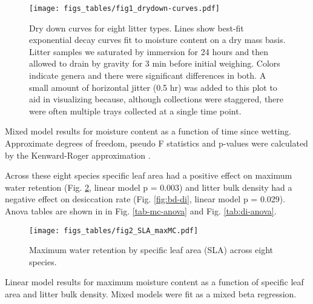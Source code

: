 \documentclass[fire,article,submit,moreauthors,pdftex]{Definitions/mdpi}
\begin{document}
\begin{figure}[H]
  \centering
\texttt{[image: figs\_tables/fig1\_drydown-curves.pdf]}
\caption{Dry down curves for eight litter types. Lines show best-fit
  exponential decay curves fit to moisture content on a dry mass basis. Litter
  samples we saturated by immersion for 24 hours and then allowed to drain by
  gravity for 3 min before initial weighing. Colors indicate genera and there
  were significant differences in both. A small amount of horizontal jitter
  (0.5 hr) was added to this plot to aid in visualizing because, although
  collections were staggered, there were often multiple trays collected at a
  single time point.}
 \label{fig:drydown}
\end{figure}


\begin{table}[H]
  \caption{Mixed model results for moisture content as a function of time since
    wetting. Approximate degrees of freedom, pseudo F statistics and p-values
    were calculated by the Kenward-Roger approximation
    \cite{Kenward_Roger-1997}.}
  \label{tab:drydown}
\centering

\end{table}


Across these eight species specific leaf area had a positive effect on maximum
water retention (Fig. \ref{fig:maxmc-di}, linear model p = 0.003) and litter
bulk density had a negative effect on desiccation rate (Fig. \ref{fig:bd-di},
linear model p = 0.029). Anova tables are shown in in Fig. \ref{tab-mc-anova}
and Fig. \ref{tab:di-anova}.

\begin{figure}[H]
  \centering
\texttt{[image: figs\_tables/fig2\_SLA\_maxMC.pdf]}
\caption{Maximum water retention by specific leaf area (SLA) across eight species.}
  \label{fig:maxmc-di}
\end{figure}

\begin{table}[H]
  \caption{Linear model results for maximum moisture content as a function of specific leaf area and litter bulk density. Mixed models were fit as a mixed beta regression. }
  \label{tab2:mc-anova}
\centering

\end{table}
\end{document}
